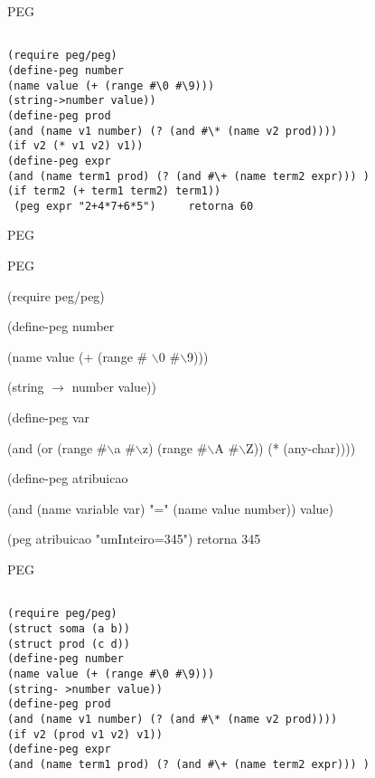 \documentclass{beamer}
\begin{document}



\begin{frame}[fragile]{PEG}
\begin{verbatim}

(require peg/peg)
(define-peg number
(name value (+ (range #\0 #\9)))
(string->number value))
(define-peg prod
(and (name v1 number) (? (and #\* (name v2 prod))))
(if v2 (* v1 v2) v1))
(define-peg expr
(and (name term1 prod) (? (and #\+ (name term2 expr))) )
(if term2 (+ term1 term2) term1))
 (peg expr "2+4*7+6*5")     retorna 60
\end{verbatim}
\end{frame}



\begin{frame}[fragile]{PEG}

PEG

(require peg/peg)

(define-peg number

            (name value (+ (range \# $\backslash$0 \#$\backslash$9)))
            
            (string $\longrightarrow$ number value))
            
(define-peg var

            (and (or (range \#$\backslash$a \#$\backslash$z) (range \#$\backslash$A \#$\backslash$Z)) (* (any-char))))
            

(define-peg atribuicao

            (and (name variable var) "=" (name value number)) value)
            
(peg atribuicao "umInteiro=345") retorna 345

\end{frame}



\begin{frame}[fragile]{PEG}
\begin{verbatim}

(require peg/peg)
(struct soma (a b))
(struct prod (c d))
(define-peg number
(name value (+ (range #\0 #\9)))
(string- >number value))
(define-peg prod
(and (name v1 number) (? (and #\* (name v2 prod))))
(if v2 (prod v1 v2) v1))
(define-peg expr
(and (name term1 prod) (? (and #\+ (name term2 expr))) )

\end{verbatim}
\end{frame}
\end{document}
